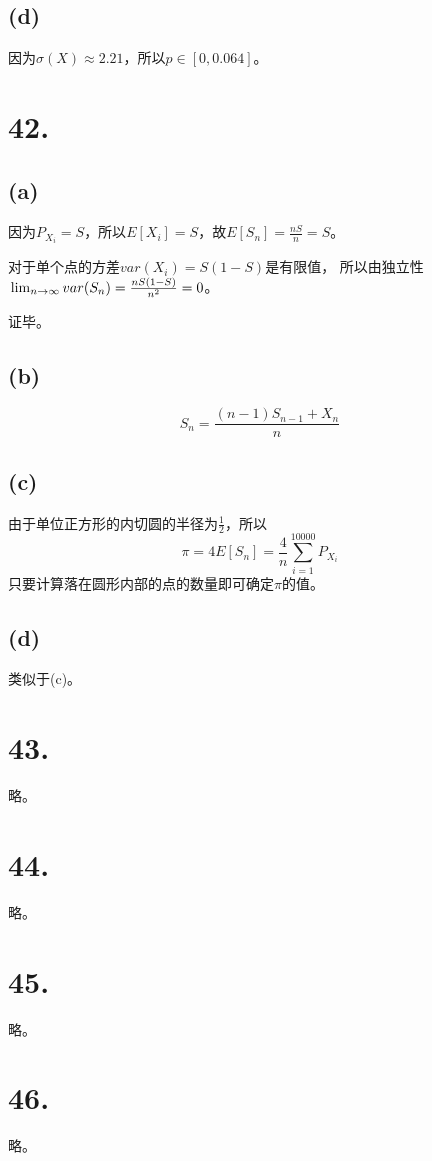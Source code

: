 \documentclass[UTF8]{report}
\begin{document}
        \subsection*{(d)}
            因为$\sigma(X) \approx 2.21$，所以$p \in [0, 0.064]$。
    \section*{42.}
        \subsection*{(a)}
            因为$P_{X_i} = S$，所以$E[X_i] = S$，故$E[S_n] = \frac{nS}{n} = S$。

            对于单个点的方差$var(X_i) = S(1 - S)$是有限值，
            所以由独立性$\\\lim_{n \to \infty}var(S_n) = \frac{nS(1 - S)}{n^2} = 0$。

            证毕。
        \subsection*{(b)}
            $$S_n = \frac{(n - 1)S_{n - 1} + X_n}{n}$$
        \subsection*{(c)}
            由于单位正方形的内切圆的半径为$\frac{1}{2}$，所以
            $$\pi = 4E[S_n] = \frac{4}{n}\sum_{i = 1}^{10000}P_{X_i}$$
            只要计算落在圆形内部的点的数量即可确定$\pi$的值。

        \subsection*{(d)}
            类似于(c)。
    \section*{43.}
        略。
    \section*{44.}
        略。
    \section*{45.}
        略。
    \section*{46.}
        略。
\end{document}
